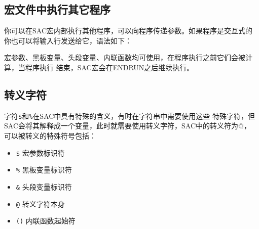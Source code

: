 \subsection{宏文件中执行其它程序}
你可以在SAC宏内部执行其他程序，可以向程序传递参数。如果程序是交互式的
你也可以将输入行发送给它，语法如下：
宏参数、黑板变量、头段变量、内联函数均可使用，在程序执行之前它们会被计算，当程序执行
结束，SAC宏会在ENDRUN之后继续执行。

\subsection{转义字符}
字符\lstinline{$}和\lstinline{%}在SAC中具有特殊的含义，有时在字符串中需要使用这些
特殊字符，但SAC会将其解释成一个变量，此时就需要使用转义字符，SAC中的转义符为@，
可以被转义的特殊符号包括：
\begin{itemize}
    \item \lstinline{$}  宏参数标识符
    \item \lstinline{%}  黑板变量标识符
    \item \lstinline{&}  头段变量标识符
    \item \lstinline{@}  转义字符本身
    \item \lstinline{()}  内联函数起始符
\end{itemize}
